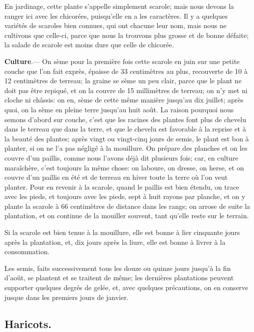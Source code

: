\documentclass[10pt,a4paper]{book}
\begin{document}
En jardinage, cette plante s'appelle simplement scarole; mais nous devons la ranger ici avec les chicorées, puisqu'elle en a les caractères. Il y a quelques variétés de scaroles bien connues, qui ont chacune leur nom, mais nous ne cultivons que celle-ci, parce que nous la trouvons plus grosse et de bonne défaite; la salade de scarole est moins dure que celle de chicorée.

\textbf{Culture}.--- On sème pour la première fois cette scarole en juin sur une petite couche que l'on fait exprès, épaisse de 33 centimètres au plus, recouverte de 10 à 12 centimètres de terreau; la graine se sème un peu clair, parce que le plant ne doit pas être repiqué, et on la couvre de 15 millimètres de terreau; on n'y met ni cloche ni châssis: on en, sème de cette même manière jusqu'au dix juillet; après quoi, on la sème en pleine terre jusqu'au huit août. La raison pourquoi nous semons d'abord sur couche, c'est que les racines des plantes font plus de chevelu dans le terreau que dans la terre, et que le chevelu est favorable à la reprise et à la beauté des plantes; après vingt ou vingt-cinq jours de semis, le plant est bon à planter, si on ne l'a pas négligé à la mouillure. On prépare des planches et on les couvre d'un paillis, comme nous l'avons déjà dit plusieurs fois; car, en culture maraîchère, c'est toujours la même chose: on laboure, on dresse, on herse, et on couvre d'un paillis en été et de terreau en hiver toute la terre où l'on veut planter. Pour en revenir à la scarole, quand le paillis est bien étendu, on trace avec les pieds, et toujours avec les pieds, sept à huit rayons par planche, et on y plante la scarole à 66 centimètres de distance dans les rangs; on arrose de suite la plantation, et on continue de la mouiller souvent, tant qu'elle reste sur le terrain.

Si la scarole est bien tenue à la mouillure, elle est bonne à lier cinquante jours après la plantation, et, dix jours après la liure, elle est bonne à livrer à la consommation.

Les semis, faits successivement tous les douze ou quinze jours jusqu'à la fin d'août, se plantent et se traitent de même; les dernières plantations peuvent supporter quelques degrés de gelée, et, avec quelques précautions, on en conserve jusque dans les premiers jours de janvier.

\subsection{Haricots.}
\end{document}
